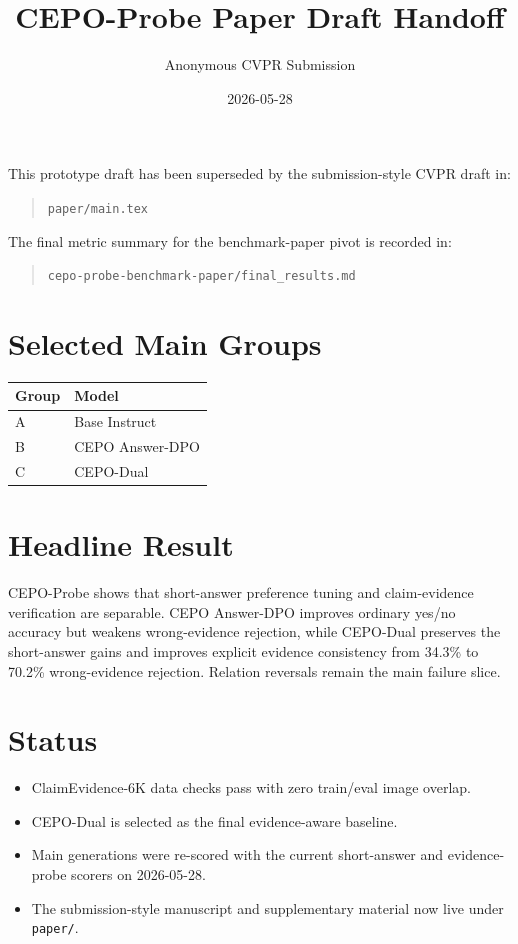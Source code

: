 \documentclass[10pt,letterpaper]{article}
\title{CEPO-Probe Paper Draft Handoff}
\author{Anonymous CVPR Submission}
\date{2026-05-28}
\begin{document}
\maketitle

This prototype draft has been superseded by the submission-style CVPR draft in:

\begin{quote}
\texttt{paper/main.tex}
\end{quote}

The final metric summary for the benchmark-paper pivot is recorded in:

\begin{quote}
\texttt{cepo-probe-benchmark-paper/final\_results.md}
\end{quote}

\section*{Selected Main Groups}

\begin{table}[h]
\centering
\begin{tabular}{ll}
\toprule
Group & Model \\
\midrule
A & Base Instruct \\
B & CEPO Answer-DPO \\
C & CEPO-Dual \\
\bottomrule
\end{tabular}
\end{table}

\section*{Headline Result}

CEPO-Probe shows that short-answer preference tuning and claim-evidence
verification are separable. CEPO Answer-DPO improves ordinary yes/no accuracy
but weakens wrong-evidence rejection, while CEPO-Dual preserves the
short-answer gains and improves explicit evidence consistency from 34.3\% to
70.2\% wrong-evidence rejection. Relation reversals remain the main failure
slice.

\section*{Status}

\begin{itemize}
    \item ClaimEvidence-6K data checks pass with zero train/eval image overlap.
    \item CEPO-Dual is selected as the final evidence-aware baseline.
    \item Main generations were re-scored with the current short-answer and
    evidence-probe scorers on 2026-05-28.
    \item The submission-style manuscript and supplementary material now live
    under \texttt{paper/}.
\end{itemize}
\end{document}
